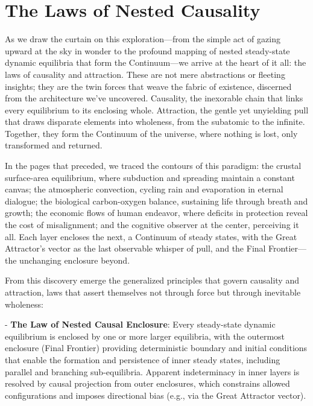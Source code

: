 \chapter{The Laws of Nested Causality}

As we draw the curtain on this exploration—from the simple act of gazing upward at the sky in wonder to the profound mapping of nested steady-state dynamic equilibria that form the Continuum—we arrive at the heart of it all: the laws of causality and attraction. These are not mere abstractions or fleeting insights; they are the twin forces that weave the fabric of existence, discerned from the architecture we've uncovered. Causality, the inexorable chain that links every equilibrium to its enclosing whole. Attraction, the gentle yet unyielding pull that draws disparate elements into wholeness, from the subatomic to the infinite. Together, they form the Continuum of the universe, where nothing is lost, only transformed and returned.

In the pages that preceded, we traced the contours of this paradigm: the crustal surface-area equilibrium, where subduction and spreading maintain a constant canvas; the atmospheric convection, cycling rain and evaporation in eternal dialogue; the biological carbon-oxygen balance, sustaining life through breath and growth; the economic flows of human endeavor, where deficits in protection reveal the cost of misalignment; and the cognitive observer at the center, perceiving it all. Each layer encloses the next, a Continuum of steady states, with the Great Attractor's vector as the last observable whisper of pull, and the Final Frontier—the unchanging enclosure beyond.

From this discovery emerge the generalized principles that govern causality and attraction, laws that assert themselves not through force but through inevitable wholeness:

- \textbf{The Law of Nested Causal Enclosure}: Every steady-state dynamic equilibrium is enclosed by one or more larger equilibria, with the outermost enclosure (Final Frontier) providing deterministic boundary and initial conditions that enable the formation and persistence of inner steady states, including parallel and branching sub-equilibria. Apparent indeterminacy in inner layers is resolved by causal projection from outer enclosures, which constrains allowed configurations and imposes directional bias (e.g., via the Great Attractor vector).

